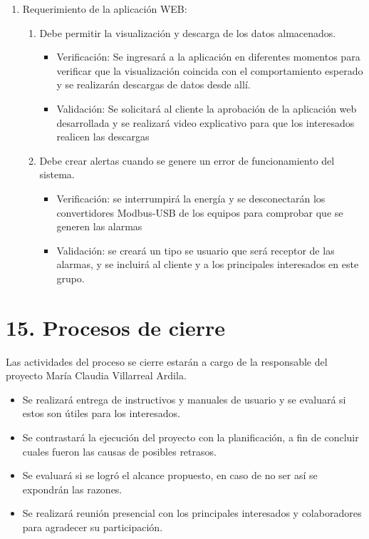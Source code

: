 \documentclass[
11pt, %
codirector, %
]{charter}
\begin{document}
\begin{enumerate}
\begin{enumerate}
			\end{enumerate}
	\item Requerimiento de la aplicación WEB:
	\begin{enumerate}
			\item Debe permitir la visualización y descarga de los datos almacenados.
\begin{itemize}
\item Verificación: Se ingresará a la aplicación en diferentes momentos para verificar que la visualización coincida con el comportamiento esperado y se realizarán descargas de datos desde allí.
\item Validación: Se solicitará al cliente la aprobación de la aplicación web desarrollada y se realizará video explicativo para que los interesados realicen las descargas
 
\end{itemize}
			\item Debe crear alertas cuando se genere un error de funcionamiento del sistema.
			
\begin{itemize}
\item Verificación: se interrumpirá la energía y se desconectarán los convertidores Modbus-USB de los equipos para comprobar que se generen las alarmas
\item Validación: se creará un tipo se usuario que será receptor de las alarmas, y se incluirá al cliente y a los principales interesados en este grupo.
\end{itemize}			
			\end{enumerate}

\end{enumerate}

\section{15. Procesos de cierre}    
\label{sec:cierre}

Las actividades del proceso se cierre estarán a cargo de la responsable del proyecto María Claudia Villarreal Ardila.

\begin{itemize}
	\item Se realizará entrega de instructivos y manuales de usuario y se evaluará si estos son útiles para los interesados. 
	\item Se contrastará la ejecución del proyecto con la planificación, a fin de concluir cuales fueron las causas de posibles retrasos.
	\item Se evaluará si se logró el alcance propuesto, en caso de no ser así se expondrán las razones.
	\item Se realizará reunión presencial con los principales interesados y colaboradores para agradecer su participación.
	
	  
\end{itemize}
\end{document}
